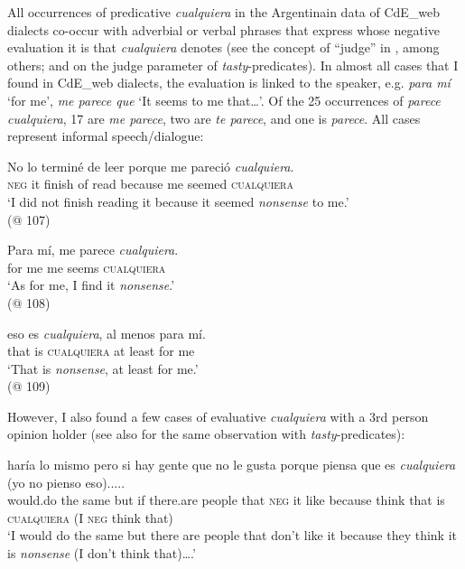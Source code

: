 All occurrences of predicative \textit{cualquiera} in the Argentinain data of CdE\_web dialects co-occur with adverbial or verbal phrases that express whose negative evaluation it is that \textit{cualquiera} denotes (see the concept of “judge” in \citealt{Lasersohn2005}, among others; and  on the judge parameter of \textit{tasty}{}-predicates). In almost all cases that I found in CdE\_web dialects, the evaluation is linked to the speaker, e.g. \textit{para mí} ‘for me’, \textit{me parece que} ‘It seems to me that…’. Of the 25 occurrences of \textit{parece cualquiera}, 17 are \textit{me parece}, two are \textit{te parece}, and one is \textit{parece}. All cases represent informal speech/dialogue:

\ea \label{ex:key:194}
    \gll No lo terminé de leer porque me pareció \textit{cualquiera}.\\
    \textsc{neg} it finish of read because me seemed \textsc{cualquiera}\\
    \glt ‘I did not finish reading it because it seemed \textit{nonsense} to me.’\\
    (@ 107)
\z


\ea \label{ex:key:195} %
    \gll Para mí, me parece \textit{cualquiera}.\\
    for me me seems \textsc{cualquiera}\\
    \glt ‘As for me, I find it \textit{nonsense}.’\\
    (@ 108)
\z 

\ea \label{ex:key:196} %
    \gll eso es \textit{cualquiera}, al menos para mí.\\
    that is \textsc{cualquiera} at least for me\\
    \glt ‘That is \textit{nonsense}, at least for me.’\\
    (@ 109)
\z

However, I also found a few cases of evaluative \textit{cualquiera} with a 3rd person opinion holder (see also \citealt{Lasersohn2005} for the same observation with \textit{tasty}{}-predicates):

\ea \label{ex:key:197} %
    \gll haría lo mismo pero si hay gente que no le gusta porque piensa que es \textit{cualquiera} (yo no pienso eso).....\\
    would.do the same but if there.are people that \textsc{neg} it like because think that is \textsc{cualquiera} (I \textsc{neg} think that)\\ 
    \glt ‘I would do the same but there are people that don’t like it because they think it is \textit{nonsense} (I don’t think that)….’

